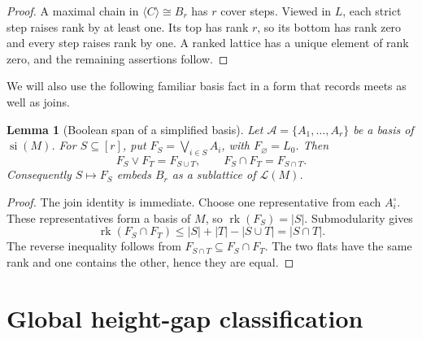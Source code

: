 \documentclass[11pt]{article}
\newtheorem{lemma}[theorem]{Lemma}
\theoremstyle{definition}
\theoremstyle{remark}
\newcommand{\rk}{\operatorname{rk}}
\newcommand{\si}{\operatorname{si}}
\newcommand{\cL}{\mathcal L}
\begin{document}
\begin{proof}
A maximal chain in $\langle C\rangle\cong B_r$ has $r$ cover steps.  Viewed
in $L$, each strict step raises rank by at least one.  Its top has rank $r$,
so its bottom has rank zero and every step raises rank by one.  A ranked
lattice has a unique element of rank zero, and the remaining assertions
follow.
\end{proof}

We will also use the following familiar basis fact in a form that records
meets as well as joins.

\begin{lemma}[Boolean span of a simplified basis]\label{lem:basis-span}
Let $\mathcal A=\{A_1,\ldots,A_r\}$ be a basis of $\si(M)$.  For
$S\subseteq[r]$, put $F_S=\bigvee_{i\in S}A_i$, with $F_\varnothing=L_0$.
Then
\[
 F_S\vee F_T=F_{S\cup T},\qquad F_S\cap F_T=F_{S\cap T}.
\]
Consequently $S\mapsto F_S$ embeds $B_r$ as a sublattice of $\cL(M)$.
\end{lemma}

\begin{proof}
The join identity is immediate.  Choose one representative from each
$A_i^\circ$.  These representatives form a basis of $M$, so
$\rk(F_S)=|S|$.  Submodularity gives
\[
 \rk(F_S\cap F_T)
 \le |S|+|T|-|S\cup T|=|S\cap T|.
\]
The reverse inequality follows from $F_{S\cap T}\subseteq F_S\cap F_T$.
The two flats have the same rank and one contains the other, hence they are
equal.
\end{proof}

\section{Global height-gap classification}
\end{document}
